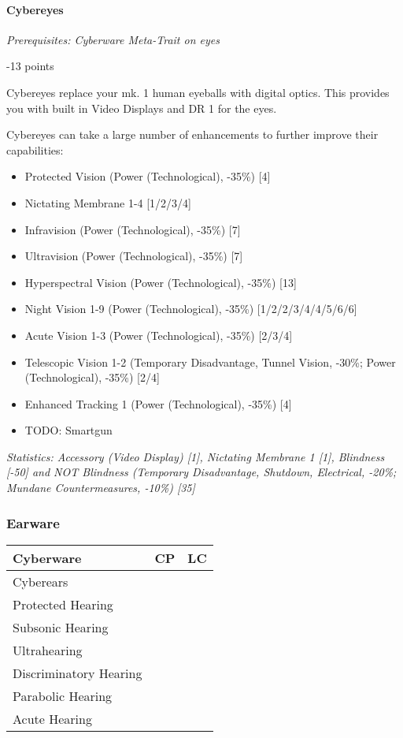 \begin{multicols*}{3}
	\paragraph{Cybereyes}
	\textit{Prerequisites: Cyberware Meta-Trait on eyes}
	\begin{flushright}
		-13 points
	\end{flushright}
	
	Cybereyes replace your mk. 1 human eyeballs with digital optics. This provides you with built in Video Displays and DR 1 for the eyes.
	
	Cybereyes can take a large number of enhancements to further improve their capabilities: 
	
	\begin{itemize}
		\item Protected Vision (Power (Technological), -35\%) [4]
		\item Nictating Membrane 1-4 [1/2/3/4]
		\item Infravision (Power (Technological), -35\%) [7]
		\item Ultravision (Power (Technological), -35\%) [7]
		\item Hyperspectral Vision (Power (Technological), -35\%) [13]
		\item Night Vision 1-9 (Power (Technological), -35\%) [1/2/2/3/4/4/5/6/6]
		\item Acute Vision 1-3 (Power (Technological), -35\%) [2/3/4]
		\item Telescopic Vision 1-2 (Temporary Disadvantage, Tunnel Vision, -30\%; Power (Technological), -35\%) [2/4]
		\item Enhanced Tracking 1 (Power (Technological), -35\%) [4]
		\item TODO: Smartgun
	\end{itemize}
	
	\textit{\textcolor{OliveGreen}{Statistics: Accessory (Video Display) [1], Nictating Membrane 1 [1], Blindness [-50] and NOT Blindness (Temporary Disadvantage, Shutdown, Electrical, -20\%; Mundane Countermeasures, -10\%) [35]}}
	
	\subsubsection{Earware}
	
	\begin{center}
		\begin{tabularx}{0.32\textwidth}{|X|c|c|}
			\hline
			Cyberware & CP & LC\\
			\hline
			\hline
			Cyberears & & \\
			\hline
			Protected Hearing & & \\
			Subsonic Hearing & & \\
			Ultrahearing & & \\
			Discriminatory Hearing & & \\
			Parabolic Hearing & & \\
			Acute Hearing & & \\
			\hline
		\end{tabularx}
	\end{center}
	

\end{multicols*}
